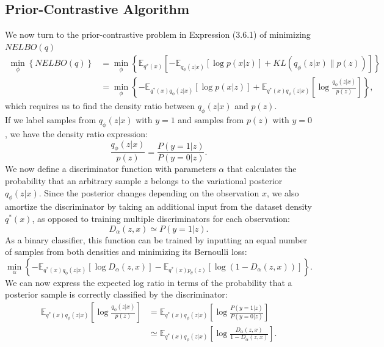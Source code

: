 \documentclass[honours,12pt, twoside]{unswthesis}
\newcommand{\E}{\mathbb{E}}
\numberwithin{equation}{section}
\theoremstyle{definition}
\begin{document}
\subsection{Prior-Contrastive Algorithm}\label{sec:4.1.2}
We now turn to the prior-contrastive problem in Expression (3.6.1) of minimizing $NELBO(q)$
\begin{align}
\min_{\phi} \left\lbrace NELBO(q)\right\rbrace&=\min_{\phi}\left\lbrace\mathbb{E}_{q^*(x)}\left[-\E_{q_\phi(z|x)}[\log p(x|z)]+KL(q_\phi(z|x)\|p(z))\right]\right\rbrace\nonumber\\
&=\min_\phi \left\lbrace-\mathbb{E}_{q^*(x)q_\phi(z|x)}[\log p(x|z)]+\mathbb{E}_{q^*(x)q_\phi(z|x)}\left[\log \frac{q_\phi(z|x)}{p(z)}\right]\right\rbrace,
\end{align}
which requires us to find the density ratio between $q_\phi(z|x)$ and $p(z)$.\\
If we label samples from $q_\phi(z|x)$ with $y=1$ and samples from $p(z)$ with $y=0$, we have the density ratio expression:
\[\frac{q_\phi(z|x)}{p(z)}=\frac{P(y=1|z)}{P(y=0|z)}.\]
We now define a discriminator function with parameters $\alpha$ that calculates the probability that an arbitrary sample $z$ belongs to the variational posterior $q_\phi(z|x)$. Since the posterior changes depending on the observation $x$, we also amortize the discriminator by taking an additional input from the dataset density $q^*(x)$, as opposed to training multiple discriminators for each observation:
\[D_\alpha(z,x)\simeq P(y=1|z).\]
As a binary classifier, this function can be trained by inputting an equal number of samples from both densities and minimizing its Bernoulli loss:
\begin{equation}
\min_\alpha \left\lbrace-\mathbb{E}_{q^*(x)q_\phi(z|x)}[\log D_\alpha(z,x)]-\mathbb{E}_{q^*(x)p_\theta(z)}[\log (1-D_\alpha(z,x))]\right\rbrace.
\end{equation}
We can now express the expected log ratio in terms of the probability that a posterior sample is correctly classified by the discriminator:
\begin{align*}
\mathbb{E}_{q^*(x)q_\phi(z|x)}\left[\log \frac{q_\phi(z|x)}{p(z)}\right]&=\mathbb{E}_{q^*(x)q_\phi(z|x)}\left[\log \frac{P(y=1|z)}{P(y=0|z)}\right]\\
&\simeq \mathbb{E}_{q^*(x)q_\phi(z|x)}\left[\log \frac{D_\alpha(z,x)}{1-D_\alpha(z,x)}\right].
\end{align*}
\end{document}
